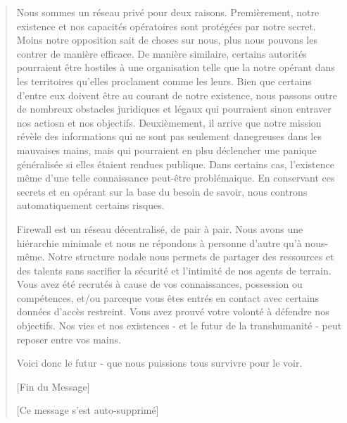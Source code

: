 \begin{quotation}
Nous sommes un réseau privé pour deux raisons. Premièrement, notre existence et nos capacités opératoires sont protégées par notre secret. Moins notre opposition sait de choses sur nous, plus nous pouvons les contrer de manière efficace. De manière similaire, certains autorités pourraient être hostiles à une organisation telle que la notre opérant dans les territoires qu'elles proclament comme les leurs. Bien que certains d'entre eux doivent être au courant de notre existence, nous passons outre de nombreux obstacles juridiques et légaux qui pourraient sinon entraver nos actiosn et nos objectifs. Deuxièmement, il arrive que notre mission révèle des informations qui ne sont pas seulement danegreuses dans les mauvaises mains, mais qui pourraient en plsu déclencher une panique généralisée si elles étaient rendues publique. Dans certains cas, l'existence même d'une telle connaissance peut-être problémaique. En conservant ces secrets et en opérant sur la base du besoin de savoir, nous controns automatiquement certains risques. 

Firewall est un réseau décentralisé, de pair à pair. Nous avons une hiérarchie minimale et nous ne répondons à personne d'autre qu'à nous-même. Notre structure nodale nous permets de partager des ressources et des talents sans sacrifier la sécurité et l'intimité de nos agents de terrain. Vous avez été recrutés à cause de vos connaissances, possession ou compétences, et/ou parceque vous êtes entrés en contact avec certains données d'accès restreint. Vous avez prouvé votre volonté à défendre nos objectifs. Nos vies et nos existences - et le futur de la transhumanité - peut reposer entre vos mains. 

Voici donc le futur - que nous puissions tous survivre pour le voir. 

[Fin du Message] 

[Ce message s'est auto-supprimé] 

\end{quotation} 

